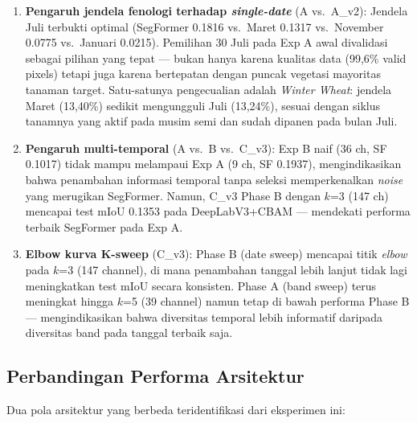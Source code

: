 \begin{enumerate}
    \item \textbf{Pengaruh jendela fenologi terhadap \textit{single-date}} (A vs.\ A\_v2):
    Jendela Juli terbukti optimal (SegFormer 0.1816 vs.\ Maret 0.1317 vs.\ November 0.0775 vs.\ Januari 0.0215).
    Pemilihan 30 Juli pada Exp A awal divalidasi sebagai pilihan yang tepat --- bukan hanya
    karena kualitas data (99,6\% valid pixels) tetapi juga karena bertepatan dengan puncak
    vegetasi mayoritas tanaman target.
    Satu-satunya pengecualian adalah \textit{Winter Wheat}: jendela Maret (13,40\%) sedikit
    mengungguli Juli (13,24\%), sesuai dengan siklus tanamnya yang aktif pada musim semi dan
    sudah dipanen pada bulan Juli.

    \item \textbf{Pengaruh multi-temporal} (A vs.\ B vs.\ C\_v3):
    Exp B naif (36 ch, SF 0.1017) tidak mampu melampaui Exp A (9 ch, SF 0.1937), mengindikasikan
    bahwa penambahan informasi temporal tanpa seleksi memperkenalkan \textit{noise} yang merugikan
    SegFormer. Namun, C\_v3 Phase B dengan $k$=3 (147 ch) mencapai test mIoU 0.1353 pada
    DeepLabV3+CBAM --- mendekati performa terbaik SegFormer pada Exp A.

    \item \textbf{Elbow kurva K-sweep} (C\_v3):
    Phase B (date sweep) mencapai titik \textit{elbow} pada $k$=3 (147 channel), di mana
    penambahan tanggal lebih lanjut tidak lagi meningkatkan test mIoU secara konsisten.
    Phase A (band sweep) terus meningkat hingga $k$=5 (39 channel) namun tetap di bawah
    performa Phase B --- mengindikasikan bahwa diversitas temporal lebih informatif daripada
    diversitas band pada tanggal terbaik saja.
\end{enumerate}

\subsection{Perbandingan Performa Arsitektur}

Dua pola arsitektur yang berbeda teridentifikasi dari eksperimen ini:

